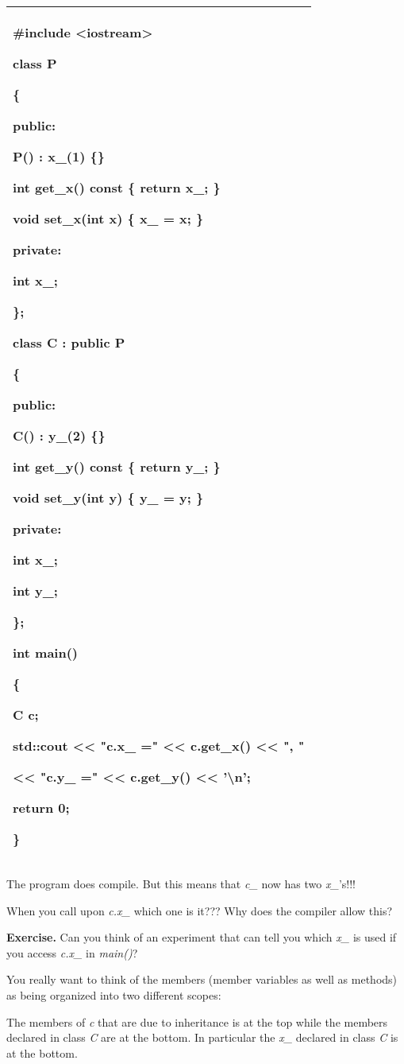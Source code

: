 \documentclass[
]{article}
\begin{document}
\begin{longtable}[]{@{}l@{}}
\toprule
\endhead
\begin{minipage}[t]{0.97\columnwidth}\raggedright
\#include \textless iostream\textgreater{}

class P

\{

public:

P() : x\_(1) \{\}

int get\_x() const \{ return x\_; \}

void set\_x(int x) \{ x\_ = x; \}

private:

int x\_;

\};

class C : public P

\{

public:

C() : y\_(2) \{\}

int get\_y() const \{ return y\_; \}

void set\_y(int y) \{ y\_ = y; \}

private:

\textbf{int x\_;}

int y\_;

\};

int main()

\{

C c;

std::cout \textless\textless{} "c.x\_ =" \textless\textless{} c.get\_x()
\textless\textless{} ", "

\textless\textless{} "c.y\_ =" \textless\textless{} c.get\_y()
\textless\textless{} '\textbackslash n';

return 0;

\}\strut
\end{minipage}\tabularnewline
\bottomrule
\end{longtable}

The program does compile. But this means that \emph{c\_} now has two
\emph{x\_}'s!!!

When you call upon \emph{c.x\_} which one is it??? Why does the compiler
allow this?

\textbf{Exercise.} Can you think of an experiment that can tell you
which \emph{x\_} is used if you access \emph{c.x\_} in \emph{main()}?

You really want to think of the members (member variables as well as
methods) as being organized into two different scopes:

The members of \emph{c} that are due to inheritance is at the top while
the members declared in class \emph{C} are at the bottom. In particular
the \emph{x\_} declared in class \emph{C} is at the bottom.
\end{document}
